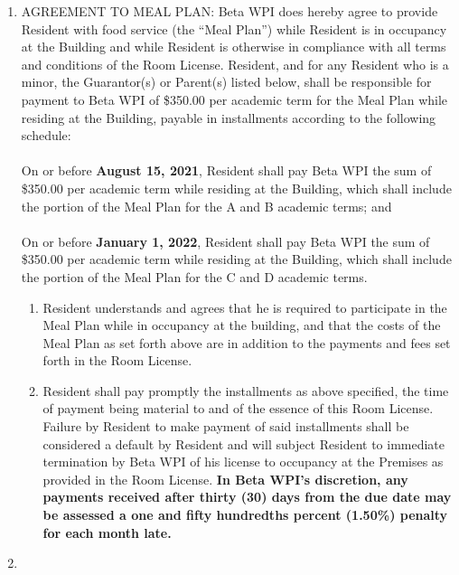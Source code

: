 \documentclass[legalpaper, 12pt]{article}
\begin{document}
\begin{enumerate}
\item\label{itm:mealplan}

AGREEMENT TO MEAL PLAN\@: Beta WPI does hereby agree to provide Resident with food service (the ``Meal Plan'') while Resident is in occupancy at the Building and while Resident is otherwise in compliance with all terms and conditions of the Room License.
Resident, and for any Resident who is a minor, the Guarantor(s) or Parent(s) listed below, shall be responsible for payment to Beta WPI of \$350.00 per academic term for the Meal Plan while residing at the Building, payable in installments according to the following schedule:\\\\ On or before \textbf{August 15, 2021}, Resident shall pay Beta WPI the sum of \$350.00 per academic term while residing at the Building, which shall include the portion of the Meal Plan for the A and B academic terms; and\\\\ On or before \textbf{January 1, 2022}, Resident shall pay Beta WPI the sum of \$350.00 per academic term while residing at the Building, which shall include the portion of the Meal Plan for the C and D academic terms.

\begin{enumerate}[label=\Alph*.]

         \item Resident understands and agrees that he is required to participate in the Meal Plan while in occupancy at the building, and that the costs of the Meal Plan as set forth above are in addition to the payments and fees set forth in the Room License.

        \item Resident shall pay promptly the installments as above specified, the time of payment being material to and of the essence of this Room License.
Failure by Resident to make payment of said installments shall be considered a default by Resident and will subject Resident to immediate termination by Beta WPI of his license to occupancy at the Premises as provided in the Room License.
\textbf{In Beta WPI's discretion, any payments received after thirty (30) days from the due date may be assessed a one and fifty hundredths percent (1.50\%) penalty for each month late.}

\end{enumerate}

\item\label{itm:rules}


\end{enumerate}
\end{document}
